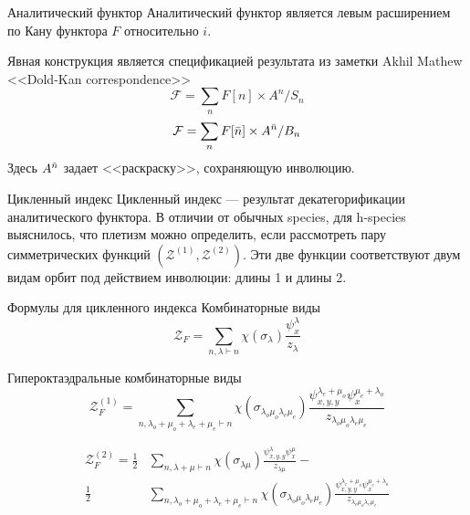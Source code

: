 \documentclass{beamer}
\begin{document}
\begin{frame}{Аналитический функтор}
Аналитический функтор является левым расширением по Кану функтора $F$
относительно $i$.
\begin{center}
\end{center}
Явная конструкция является спецификацией результата из заметки Akhil Mathew
<<Dold-Kan correspondence>>
$$
\mathcal F = \sum\limits_n F[n] \times A^{n} / S_n
$$                   
$$
\mathcal F = \sum\limits_n F[\Bar n] \times A^{\Bar n} / B_n
$$
Здесь $A^{\Bar n}$ задает <<раскраску>>, сохраняющую инволюцию.
\end{frame}

\begin{frame}{Цикленный индекс}
Цикленный индекс --- результат декатегорификации аналитического функтора.
В отличии от обычных species, для h-species выяснилось, что плетизм можно
определить, если рассмотреть пару симметрических функций
$(\mathcal Z^{(1)}, \mathcal Z^{(2)})$. Эти две функции соответствуют двум
видам орбит под действием инволюции: длины 1 и длины 2.
\end{frame}

\begin{frame}{Формулы для цикленного индекса}
Комбинаторные виды
$$
\mathcal Z_F = 
\sum_{n, \lambda \vdash n}\chi(\sigma_{\lambda})
\frac{\psi_{x}^{\lambda}}{z_{\lambda}}
$$

Гипероктаэдральные комбинаторные виды
\begin{equation}
\mathcal Z_F^{(1)} = 
\sum_{n, \lambda_o + \mu_o + \lambda_e + \mu_e \vdash
n}\chi(\sigma_{\lambda_o \mu_o \lambda_e \mu_e})
\frac{\psi_{x, y, y}^{\lambda_e + \mu_o} \psi_{x}^{\mu_e + 
\lambda_o}}{z_{\lambda_o \mu_o \lambda_e \mu_e}}
\end{equation}

\begin{equation}
\begin{split}
\mathcal Z_F^{(2)} = 
\frac{1}{2}&
\sum_{n, \lambda + \mu \vdash n}\chi(\sigma_{\lambda \mu})
\frac{\psi_{x, y, y}^{\lambda} \psi_{x}^{\mu}}{z_{\lambda \mu}}
- \\
\frac{1}{2}&
\sum_{n, \lambda_o + \mu_o + \lambda_e + \mu_e \vdash
n}\chi(\sigma_{\lambda_o \mu_o \lambda_e \mu_e})
\frac{\psi_{x, y, y}^{\lambda_e + \mu_o} \psi_{x}^{\mu_e + 
\lambda_o}}{z_{\lambda_o \mu_o \lambda_e \mu_e}}
\end{split}
\end{equation}

\end{frame}
\end{document}
